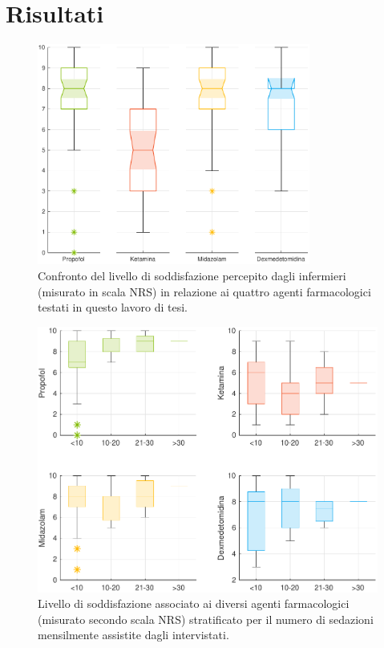 \chapter{Risultati}

\begin{figure}[h]
    \centering
    \includegraphics[width=0.8\textwidth]{Figure/qualita-colorful.pdf}
    \caption{Confronto del livello di soddisfazione percepito dagli infermieri (misurato in scala NRS) in relazione ai quattro agenti farmacologici testati in questo lavoro di tesi.}
    \label{fig:qualitascolorful}
\end{figure}

\begin{figure}[h]
    \centering
    \includegraphics[width=1\textwidth]{Figure/qualita-stratificata.pdf}
    \caption{Livello di soddisfazione associato ai diversi agenti farmacologici (misurato secondo scala NRS) stratificato per il numero di sedazioni mensilmente assistite dagli intervistati.}
    \label{fig:qualitastratificata}
\end{figure}